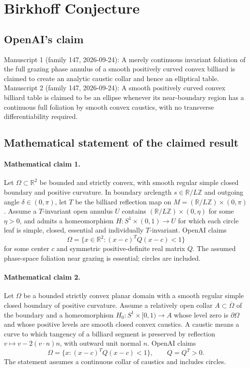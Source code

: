 \documentclass[11pt]{article}
\begin{document}
\section*{Birkhoff Conjecture}

\subsection{OpenAI's claim}
Manuscript 1 (family 147, 2026-09-24): A merely continuous invariant foliation of the full grazing phase annulus of a smooth positively curved convex billiard is claimed to create an analytic caustic collar and hence an elliptical table. Manuscript 2 (family 147, 2026-09-24): A smooth positively curved convex billiard table is claimed to be an ellipse whenever its near-boundary region has a continuous full foliation by smooth convex caustics, with no transverse differentiability required.

\subsection{Mathematical statement of the claimed result}
\paragraph{Mathematical claim 1.} Let $\Omega\subset\mathbb R^2$ be bounded and strictly convex, with smooth regular simple closed boundary and positive curvature. In boundary arclength $s\in\mathbb R/L\mathbb Z$ and outgoing angle $\delta\in(0,\pi)$, let $T$ be the billiard reflection map on $M=(\mathbb R/L\mathbb Z)\times(0,\pi)$. Assume a $T$-invariant open annulus $U$ contains $(\mathbb R/L\mathbb Z)\times(0,\eta)$ for some $\eta>0$, and admits a homeomorphism $H:S^1\times(0,1)\to U$ for which each circle leaf is simple, closed, essential and individually $T$-invariant. OpenAI claims
\[
\Omega=\{x\in\mathbb R^2:(x-c)^TQ(x-c)<1\}
\]
for some center $c$ and symmetric positive-definite real matrix $Q$. The assumed phase-space foliation near grazing is essential; circles are included.

\paragraph{Mathematical claim 2.} Let $\Omega$ be a bounded strictly convex planar domain with a smooth regular simple closed boundary of positive curvature. Assume a relatively open collar $A\subset\overline\Omega$ of the boundary and a homeomorphism $H_0:S^1\times[0,1)\to A$ whose level zero is $\partial\Omega$ and whose positive levels are smooth closed convex caustics. A caustic means a curve to which tangency of a billiard segment is preserved by reflection $v\mapsto v-2(v\cdot n)n$, with outward unit normal $n$. OpenAI claims
\[
\Omega=\{x:(x-c)^TQ(x-c)<1\},\qquad Q=Q^T>0.
\]
The statement assumes a continuous collar of caustics and includes circles.
\end{document}
